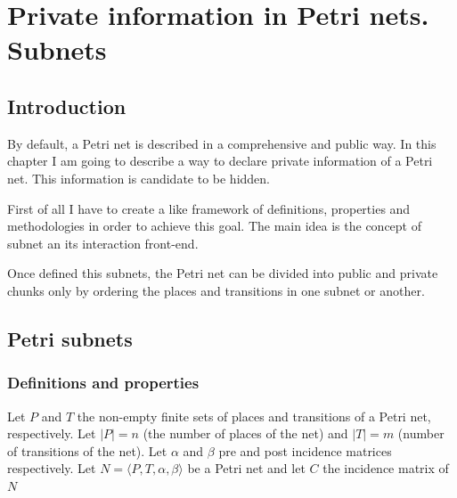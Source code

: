 
\chapter{Private information in Petri nets. Subnets} %

\label{Chapter:Private_information_inPetri_nets.Subnets} %



\section{Introduction}
By default, a Petri net is described in a comprehensive and public way.
In this chapter I am going to describe a way to declare private information of a Petri net.
This information is candidate to be hidden.


First of all I have to create a like framework of definitions, properties
and methodologies in order to achieve this goal. The main idea is the concept
of subnet an its interaction front-end.

Once defined this subnets, the Petri net can be divided into public and private
chunks only by ordering the places and transitions in one subnet or another. \section{Petri subnets}

\subsection{Definitions and properties}

Let $ P $ and $ T $ the non-empty finite sets of places and
transitions of a Petri net, respectively. Let $ | P | = n $ (the number of places
of the net) and $ | T | = m $ (number of transitions of the net). Let $ \alpha $ and $ \beta $ pre and post incidence matrices respectively. Let $ N = \langle P, T, \alpha, \beta \rangle $ be a
Petri net and let $ C $ the incidence matrix of $ N $

